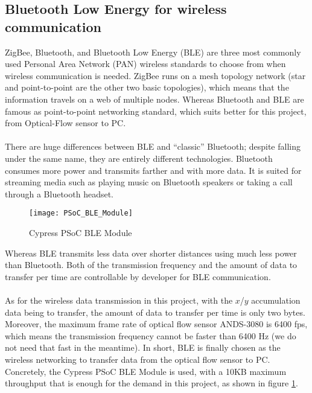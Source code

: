 \subsection{Bluetooth Low Energy for wireless communication}
%
ZigBee, Bluetooth, and Bluetooth Low Energy (BLE) are three most commonly used Personal Area Network (PAN) wireless standards to choose from when wireless communication is needed. ZigBee runs on a mesh topology network (star and point-to-point are the other two basic topologies), which means that the information travels on a web of multiple nodes. Whereas Bluetooth and BLE are famous as point-to-point networking standard, which suits better for this project, from Optical-Flow sensor to PC.
\\\\%
There are huge differences between BLE and \enquote{classic} Bluetooth; despite falling under the same name, they are entirely different technologies. Bluetooth consumes more power and transmits farther and with more data. It is suited for streaming media such as playing music on Bluetooth speakers or taking a call through a Bluetooth headset.
%
\begin{figure}[H]
\centering
\texttt{[image: PSoC\_BLE\_Module]}
\caption{Cypress PSoC BLE Module}
\label{PSoC_BLE_Module}
\end{figure}%
%
Whereas BLE transmits less data over shorter distances using much less power than Bluetooth. Both of the transmission frequency and the amount of data to transfer per time are controllable by developer for BLE communication.
\\\\
%
As for the wireless data transmission in this project, with the \(x\)/\(y\) accumulation data being to transfer, the amount of data to transfer per time is only two bytes. Moreover, the maximum frame rate of optical flow sensor ANDS-3080 is 6400 fps, which means the transmission frequency cannot be faster than 6400 Hz (we do not need that fast in the meantime). In short, BLE is finally chosen as the wireless networking to transfer data from the optical flow sensor to PC. Concretely, the Cypress PSoC BLE Module is used, with a 10KB maximum throughput that is enough for the demand in this project, as shown in figure \ref{PSoC_BLE_Module}.
%

